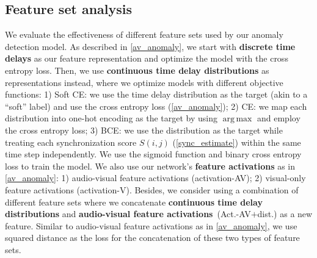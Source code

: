 \documentclass[10pt,twocolumn,letterpaper]{article}
\DeclareMathOperator*{\argmax}{arg\,max}
\begin{document}
\subsection{Feature set analysis}
\label{feature_analysis}
We evaluate the effectiveness of different feature sets used by our anomaly detection model. As described in \cref{av_anomaly}, we start with {\bf discrete time delays} as our feature representation and optimize the model with the cross entropy loss. Then, we use {\bf continuous time delay distributions} as representations instead, where we optimize models with different objective functions: 1) Soft CE: we use the time delay distribution as the target (akin to a ``soft'' label) and use the cross entropy loss (\cref{av_anomaly}); 2) CE: we map each distribution into one-hot encoding as the target by using $\argmax$ and employ the cross entropy loss; 3) BCE: we use the distribution as the target while treating each synchronization score $S(i,j)$ (\cref{sync_estimate}) within the same time step independently. We use the sigmoid function and binary cross entropy loss to train the model. We also use our network's {\bf feature activations} as in \cref{av_anomaly}: 1) audio-visual feature activations (activation-AV); 2) visual-only feature activations (activation-V). Besides, we consider using a combination of different feature sets where we concatenate {\bf continuous time delay distributions} and {\bf audio-visual feature activations}~(Act.-AV$+$dist.) as a new feature. Similar to audio-visual feature activations as in \cref{av_anomaly}, we use squared distance as the loss for the concatenation of these two types of feature sets. 
\end{document}

